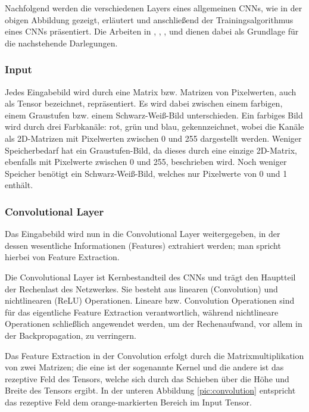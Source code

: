 Nachfolgend werden die verschiedenen Layers eines allgemeinen CNNs, wie in der obigen Abbildung gezeigt, erläutert und anschließend der Trainingsalgorithmus eines CNNs präsentiert.
Die Arbeiten in \cite{1}, \cite{2}, \cite{3}, \cite{4} und \cite{5} dienen dabei als Grundlage für die nachstehende Darlegungen.

\subsubsection{Input}
Jedes Eingabebild wird durch eine Matrix bzw. Matrizen von Pixelwerten, auch als Tensor bezeichnet, repräsentiert. Es wird dabei zwischen einem farbigen, einem Graustufen bzw. einem Schwarz-Weiß-Bild unterschieden. Ein farbiges Bild wird durch drei Farbkanäle: rot, grün und blau, gekennzeichnet, wobei die Kanäle als 2D-Matrizen mit Pixelwerten zwischen 0 und 255 dargestellt werden. Weniger Speicherbedarf hat ein Graustufen-Bild, da dieses durch eine einzige 2D-Matrix, ebenfalls mit Pixelwerte zwischen 0 und 255, beschrieben wird. Noch weniger Speicher benötigt ein Schwarz-Weiß-Bild, welches nur Pixelwerte von 0 und 1 enthält. 

\subsubsection{Convolutional Layer} 
Das Eingabebild wird nun in die Convolutional Layer weitergegeben, in der dessen wesentliche Informationen (Features) extrahiert werden; man spricht hierbei von Feature Extraction. 

Die Convolutional Layer ist Kernbestandteil des CNNs und trägt den Hauptteil der Rechenlast des Netzwerkes. Sie  besteht aus linearen (Convolution) und nichtlinearen (ReLU) Operationen. Lineare bzw. Convolution Operationen sind für das eigentliche Feature Extraction verantwortlich, während nichtlineare Operationen schließlich angewendet werden, um der Rechenaufwand, vor allem in der Backpropagation, zu verringern.

Das Feature Extraction in der Convolution erfolgt durch die Matrixmultiplikation von zwei Matrizen; die eine ist der sogenannte Kernel und die andere ist das rezeptive Feld des Tensors, welche sich durch das Schieben über die Höhe und Breite des Tensors ergibt. In der unteren Abbildung \ref{pic:convolution} entspricht das rezeptive Feld dem orange-markierten Bereich im Input Tensor.

